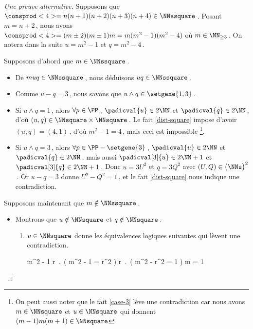 \begin{proof}[Une preuve alternative]%
	Supposons que $\consprod<4> = n(n+1)(n+2)(n+3)(n+4) \in \NNssquare$\,.
	Posant $m = n+2$\,, nous avons $\consprod<4> = (m \pm 2) (m \pm 1) m = m(m^2 - 1)(m^2 - 4)$ où $m \in \NN_{\geq 3}$\,.
	On notera dans la suite $u = m^2 - 1$ et $q = m^2 - 4$\,.
	
	\medskip
	
	Supposons d'abord que $m \in \NNssquare$\,.
	\begin{itemize}
		\item De $muq \in \NNssquare$\,, nous déduisons $uq \in \NNssquare$\,.

		\item Comme $u - q = 3$\,, nous savons que $u \wedge q \in \setgene{1, 3}$\,.

		\item Si $u \wedge q = 1$\,, 
		alors $\forall p \in \PP$\,, 
		$\padicval{u} \in 2 \NN$ et $\padicval{q} \in 2 \NN$\,,
		d'où 
		$(u, q) \in \NNsquare \times \NNsquare$\,.
		Le fait \ref{dist-square} impose d'avoir $(u, q) = (4, 1)$\,, d'où $m^2 - 1 = 4$\,, mais ceci est impossible
		\footnote{
			On peut aussi noter que le fait \ref{case-3} lève une contradiction car nous avons $m \in \NNsquare$ et $u \in \NNsquare$ qui donnent $(m-1)m(m+1) \in \NNsquare$
		}.

		\item Si $u \wedge q = 3$\,, 
		alors $\forall p \in \PP - \setgene{3}$\,, 
		$\padicval{u} \in 2 \NN$ et $\padicval{q} \in 2 \NN$\,,
		mais aussi $\padicval[3]{u} \in 2 \NN + 1$ et $\padicval[3]{q} \in 2 \NN + 1$\,.
		Donc 
		$u = 3 U^2$ et $q = 3 Q^2$ avec $(U, Q) \in \big( \NNs \big)^2$\,.
		Or $u - q = 3$ donne $U^2 - Q^2 = 1$\,, et le fait \ref{dist-square} nous indique une contradiction.
	\end{itemize}
	
	\medskip
	
	Supposons maintenant que $m \notin \NNssquare$\,.
	\begin{itemize}
		\item Montrons que $u \notin \NNsquare$ et $q \notin \NNsquare$\,.
		\begin{enumerate}
			\item $u \in \NNsquare$ donne les équivalences logiques suivantes qui lèvent une contradiction.

        	\smallskip

			\begin{stepcalc}[style = sar, ope = \iff]
        		m^2 - 1 \in \NNsquare
        	\explnext{}
        		\exists r \in \NN \,.\, \big( m^2 - 1 = r^2 \big)
        	\explnext{}
        		\exists r \in \NN \,.\, \big( m^2 - r^2 = 1 \big)
        		m = 1
        	\end{stepcalc}



\end{enumerate}
\end{itemize}
\end{proof}
